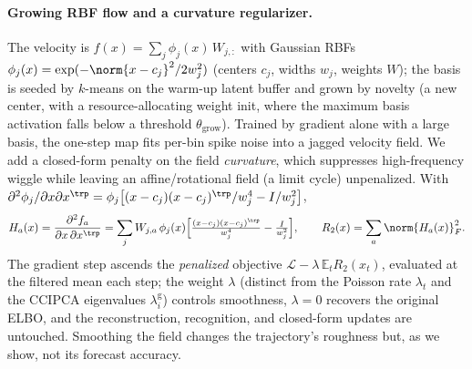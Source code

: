 \documentclass{article}
\newcommand{\E}{\mathbb{E}}
\begin{document}
\paragraph{Growing RBF flow and a curvature regularizer.}
\label{sec:curv}
The velocity is $f(x)=\sum_j \phi_j(x)\,W_{j,:}$ with Gaussian RBFs
$\phi_j(x)=\exp(-\norm{x-c_j}^2/2w_j^2)$ (centers $c_j$, widths $w_j$, weights $W$); the basis
is seeded by $k$-means on the warm-up latent buffer and grown by novelty (a new center, with a
resource-allocating weight init, where the maximum basis activation falls below a threshold
$\theta_{\mathrm{grow}}$). Trained by gradient alone with a large basis, the one-step map fits
per-bin spike noise into a jagged velocity field. We add a closed-form penalty on the field
\emph{curvature}, which suppresses high-frequency wiggle while leaving an affine/rotational
field (a limit cycle) unpenalized. With $\partial^2\phi_j/\partial x\partial x^\trp=
\phi_j\big[(x-c_j)(x-c_j)^\trp/w_j^4 - I/w_j^2\big]$,
\begin{equation}
  H_a(x)=\frac{\partial^2 f_a}{\partial x\,\partial x^\trp}
        =\sum_j W_{j,a}\,\phi_j(x)\Big[\tfrac{(x-c_j)(x-c_j)^\trp}{w_j^4}-\tfrac{I}{w_j^2}\Big],
  \qquad
  R_2(x)=\sum_a \norm{H_a(x)}_F^2 .
  \label{eq:curv}
\end{equation}
The gradient step ascends the \emph{penalized} objective $\mathcal{L}-\lambda\,\E_t R_2(x_t)$,
evaluated at the filtered mean each step; the weight $\lambda$ (distinct from the Poisson rate
$\lambda_t$ and the CCIPCA eigenvalues $\lambda^{\mathrm g}_i$) controls smoothness, $\lambda{=}0$
recovers the original ELBO, and the reconstruction, recognition, and closed-form updates are
untouched. Smoothing the field changes the trajectory's roughness but, as we show, not its
forecast accuracy.
\end{document}

